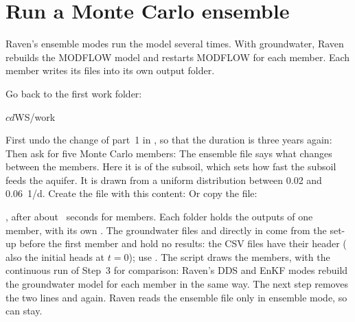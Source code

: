 \section{Run a Monte Carlo ensemble}
Raven's ensemble modes run the model several times. With groundwater, Raven rebuilds the MODFLOW model and restarts MODFLOW
for each member. Each member writes its files into its own output folder.

Go back to the first work folder:
\begin{shell}
$ cd $WS/work
\end{shell}
First undo the change of part~1 in , so that the duration is three years again:
Then ask for five Monte Carlo members:
The ensemble file  says what changes between the members. Here it is  of the subsoil, which
sets how fast the subsoil feeds the aquifer. It is drawn from a uniform distribution between 0.02 and 0.06~1/d. Create the
file  with this content:
Or copy the file: 

\see {}, after about ~seconds for  members. Each
folder  holds the outputs of one member, with its own . The groundwater files and 
directly in  come from the set-up before the first member and hold no results: the CSV files have
their header ( also the initial heads at $t=0$); use .
The script  draws the members, with the continuous run of Step~3 for comparison:
\why Raven's DDS and EnKF modes rebuild the groundwater model for each member in the same way. The next step removes
the two lines  and  again. Raven reads the ensemble file only in ensemble mode, so
 can stay.
